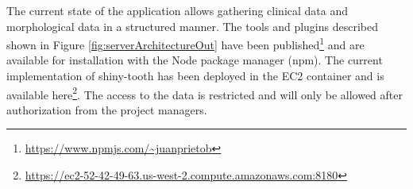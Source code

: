 \documentclass[]{spie}  %
\begin{document}
The current state of the application allows gathering clinical data and morphological data in a structured manner. 
The tools and plugins described shown in Figure \ref{fig:serverArchitectureOut} have been published\footnote{\url{https://www.npmjs.com/~juanprietob}} and are available for installation with the Node package manager (npm). 
The current implementation of shiny-tooth has been deployed in the EC2 container and is available here\footnote{\url{https://ec2-52-42-49-63.us-west-2.compute.amazonaws.com:8180}}. The access to the data is restricted and will only be allowed after authorization from the project managers. 



\scriptsize
\end{document}
